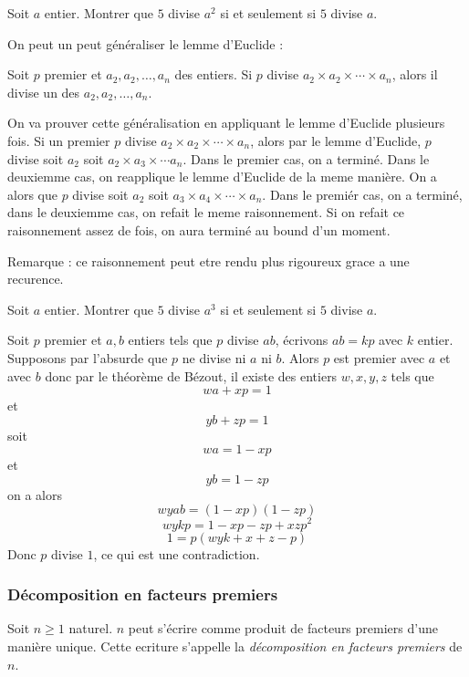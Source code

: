\exo
Soit \(a\) entier.
Montrer que \(5\) divise \(a^2\) si et seulement si \(5\) divise \(a\).

On peut un peut généraliser le lemme d'Euclide :


Soit \(p\) premier et \(a_2 , a_2 , \ldots , a_{n}\) des entiers. Si \(p\) divise \(a_2 \times a_2 \times \cdots \times a_{n}\), alors il divise un des \(a_2 , a_2 , \ldots , a_{n}\).

\endgroup

\preuve

On va prouver cette généralisation en appliquant le lemme d'Euclide plusieurs fois.
Si un premier \(p\) divise \(a_2 \times a_2 \times \cdots \times a_{n}\), alors par le lemme d'Euclide, \(p\) divise soit \(a_2\) soit \(a_2 \times a_{3} \times \cdots a_{n}\). Dans le premier cas, on a terminé. Dans le deuxiemme cas, on reapplique le lemme d'Euclide de la meme manière. On a alors que \(p\) divise soit \(a_2\) soit \(a_{3} \times a_{4} \times \cdots \times a_{n}\). Dans le premiér cas, on a terminé, dans le deuxiemme cas, on refait le meme raisonnement. Si on refait ce raisonnement assez de fois, on aura terminé au bound d'un moment.

Remarque : ce raisonnement peut etre rendu plus rigoureux grace a une recurence.

\exo
Soit \(a\) entier.
Montrer que \(5\) divise \(a^{3}\) si et seulement si \(5\) divise \(a\).


Soit \(p\) premier et \(a, b\) entiers tels que \(p\) divise \(ab\), écrivons \(ab = kp\) avec \(k\) entier. Supposons par l'absurde que \(p\) ne divise ni \(a\) ni \(b\). Alors \(p\) est premier avec \(a\) et avec \(b\) donc par le théorème de Bézout, il existe des entiers \(w, x, y, z\) tels que
\[wa + xp = 1\]
et
\[yb + zp = 1\]
soit
\[wa = 1 - xp\]
et
\[yb = 1 - zp\]
on a alors
\[wyab = \left(1 - xp\right)\left(1 - zp\right)\]
\[wykp = 1 - xp - zp + xzp^2\]
\[1 = p\left(wyk + x + z - p\right)\]
Donc \(p\) divise \(1\), ce qui est une contradiction.

\subsubsection{Décomposition en facteurs premiers}
Soit \(n\geqslant1\) naturel. \(n\) peut s'écrire comme produit de facteurs premiers d'une manière unique. Cette ecriture s'appelle la \textit{décomposition en facteurs premiers} de $n$.


